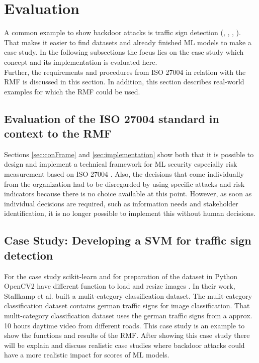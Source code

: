 \section{Evaluation}
\label{sec:evaluation}

A common example to show backdoor attacks is traffic sign detection (\cite{DBLP:journals/corr/abs-2102-10369}, \cite{DBLP:journals/corr/abs-1708-06733}, \cite{DBLP:conf/codaspy/NudingM20},
\cite{DBLP:journals/tdsc/LiXZZZ21}). That makes it easier to find datasets and already finished ML models to make a case study. In the following subsections the focus lies on the case study which concept and its implementation is evaluated here. \\ Further, the requirements and procedures from ISO 27004 in relation with the RMF is discussed in this section. In addition, this section describes real-world examples for which the RMF could be used.

\subsection{Evaluation of the ISO 27004 standard in context to the RMF}

Sections \ref{sec:conFrame} and \ref{sec:implementation} show both that it is possible to design and implement a technical framework for ML security especially risk measurement based on ISO 27004 \cite{ISO_27004_2009}. Also, the decisions that come individually from the organization had to be disregarded by using specific attacks and risk indicators because there is no choice available at this point. However, as soon as individual decisions are required, such as information needs and stakeholder identification, it is no longer possible to implement this without human decisions.

\subsection{Case Study: Developing a SVM for traffic sign detection}

For the case study scikit-learn \cite{scikit-learn} and for preparation of the dataset in Python OpenCV2 have different function to load and resize images \cite{opencv_library}. In their work, Stallkamp et al. \cite{DBLP:conf/ijcnn/StallkampSSI11} built a mulit-category classification dataset. The mulit-category classification dataset contains german traffic signs for image classification. That mulit-category classification dataset uses the german traffic signs from a approx. 10 hours daytime video from different roads.
This case study is an example to show the functions and results of the RMF. After showing this case study there will be explain and discuss realistic case studies where backdoor attacks could have a more realistic impact for scores of ML models.

